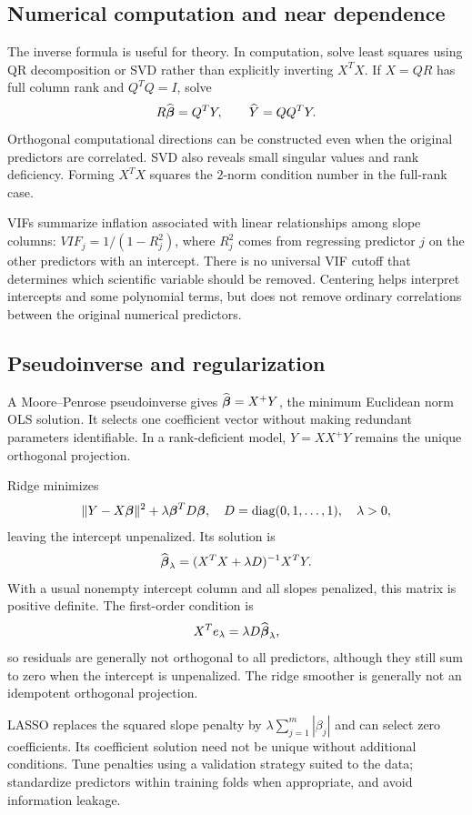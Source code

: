 \documentclass[11pt]{article}
\begin{document}
\subsection*{Numerical computation and near dependence}
The inverse formula is useful for theory. In computation, solve least squares using QR decomposition or SVD rather than explicitly inverting $X^TX$. If $X=QR$ has full column rank and $Q^TQ=I$, solve
\[
R\widehat{\boldsymbol\beta}=Q^TY,\qquad \widehat Y=QQ^TY.
\]
Orthogonal computational directions can be constructed even when the original predictors are correlated. SVD also reveals small singular values and rank deficiency. Forming $X^TX$ squares the 2-norm condition number in the full-rank case.

VIFs summarize inflation associated with linear relationships among slope columns: $VIF_j=1/(1-R_j^2)$, where $R_j^2$ comes from regressing predictor $j$ on the other predictors with an intercept. There is no universal VIF cutoff that determines which scientific variable should be removed. Centering helps interpret intercepts and some polynomial terms, but does not remove ordinary correlations between the original numerical predictors.

\subsection*{Pseudoinverse and regularization}
A Moore--Penrose pseudoinverse gives $\widehat{\boldsymbol\beta}=X^+Y$, the minimum Euclidean norm OLS solution. It selects one coefficient vector without making redundant parameters identifiable. In a rank-deficient model, $\widehat Y=XX^+Y$ remains the unique orthogonal projection.

Ridge minimizes
\[
\|Y-X\boldsymbol\beta\|^2+\lambda\boldsymbol\beta^TD\boldsymbol\beta,
\quad D=\operatorname{diag}(0,1,\ldots,1),\quad\lambda>0,
\]
leaving the intercept unpenalized. Its solution is
\[
\widehat{\boldsymbol\beta}_\lambda=(X^TX+\lambda D)^{-1}X^TY.
\]
With a usual nonempty intercept column and all slopes penalized, this matrix is positive definite. The first-order condition is
\[
X^Te_\lambda=\lambda D\widehat{\boldsymbol\beta}_\lambda,
\]
so residuals are generally not orthogonal to all predictors, although they still sum to zero when the intercept is unpenalized. The ridge smoother is generally not an idempotent orthogonal projection.

LASSO replaces the squared slope penalty by $\lambda\sum_{j=1}^m|\beta_j|$ and can select zero coefficients. Its coefficient solution need not be unique without additional conditions. Tune penalties using a validation strategy suited to the data; standardize predictors within training folds when appropriate, and avoid information leakage.
\end{document}

